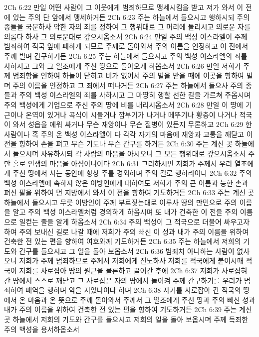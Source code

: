 2Ch 6:22  만일 어떤 사람이 그 이웃에게 범죄하므로 맹세시킴을 받고 저가 와서 이 전에 있는 주의 단 앞에서 맹세하거든
2Ch 6:23  주는 하늘에서 들으시고 행하시되 주의 종들을 국문하사 악한 자의 죄를 정하여 그 행위대로 그 머리에 돌리시고 의로운 자를 의롭다 하사 그 의로운대로 갚으시옵소서
2Ch 6:24  만일 주의 백성 이스라엘이 주께 범죄하여 적국 앞에 패하게 되므로 주께로 돌아와서 주의 이름을 인정하고 이 전에서 주께 빌며 간구하거든
2Ch 6:25  주는 하늘에서 들으시고 주의 백성 이스라엘의 죄를 사하시고 그와 그 열조에게 주신 땅으로 돌아오게 하옵소서
2Ch 6:26  만일 저희가 주께 범죄함을 인하여 하늘이 닫히고 비가 없어서 주의 벌을 받을 때에 이곳을 향하여 빌며 주의 이름을 인정하고 그 죄에서 떠나거든
2Ch 6:27  주는 하늘에서 들으사 주의 종들과 주의 백성 이스라엘의 죄를 사하시고 그 마땅히 행할 선한 길을 가르쳐 주옵시며 주의 백성에게 기업으로 주신 주의 땅에 비를 내리시옵소서
2Ch 6:28  만일 이 땅에 기근이나 온역이 있거나 곡식이 시들거나 깜부기가 나거나 메뚜기나 황충이 나거나 적국이 와서 성읍을 에워 싸거나 무슨 재앙이나 무슨 질병이 있든지 무론하고
2Ch 6:29  한 사람이나 혹 주의 온 백성 이스라엘이 다 각각 자기의 마음에 재앙과 고통을 깨닫고 이 전을 향하여 손을 펴고 무슨 기도나 무슨 간구를 하거든
2Ch 6:30  주는 계신 곳 하늘에서 들으시며 사유하시되 각 사람의 마음을 아시오니 그 모든 행위대로 갚으시옵소서 주만 홀로 인생의 마음을 아심이니이다
2Ch 6:31  그리하시면 저희가 주께서 우리 열조에게 주신 땅에서 사는 동안에 항상 주를 경외하며 주의 길로 행하리이다
2Ch 6:32  주의 백성 이스라엘에 속하지 않은 이방인에게 대하여도 저희가 주의 큰 이름과 능한 손과 펴신 팔을 위하여 먼 지방에서 와서 이 전을 향하여 기도하거든
2Ch 6:33  주는 계신 곳 하늘에서 들으시고 무릇 이방인이 주께 부르짖는대로 이루사 땅의 만민으로 주의 이름을 알고 주의 백성 이스라엘처럼 경외하게 하옵시며 또 내가 건축한 이 전을 주의 이름으로 일컫는 줄을 알게 하옵소서
2Ch 6:34  주의 백성이 그 적국으로 더불어 싸우고자 하여 주의 보내신 길로 나갈 때에 저희가 주의 빼신 이 성과 내가 주의 이름을 위하여 건축한 전 있는 편을 향하여 여호와께 기도하거든
2Ch 6:35  주는 하늘에서 저희의 기도와 간구를 들으시고 그 일을 돌아 보옵소서
2Ch 6:36  범죄치 아니하는 사람이 없사오니 저희가 주께 범죄하므로 주께서 저희에게 진노하사 저희를 적국에게 붙이시매 적국이 저희를 사로잡아 땅의 원근을 물론하고 끌어간 후에
2Ch 6:37  저희가 사로잡혀 간 땅에서 스스로 깨닫고 그 사로잡은 자의 땅에서 돌이켜 주께 간구하기를 우리가 범죄하여 패역을 행하며 악을 지었나이다 하며
2Ch 6:38  자기를 사로잡아 간 적국의 땅에서 온 마음과 온 뜻으로 주께 돌아와서 주께서 그 열조에게 주신 땅과 주의 빼신 성과 내가 주의 이름을 위하여 건축한 전 있는 편을 향하여 기도하거든
2Ch 6:39  주는 계신 곳 하늘에서 저희의 기도와 간구를 들으시고 저희의 일을 돌아 보옵시며 주께 득죄한 주의 백성을 용서하옵소서
